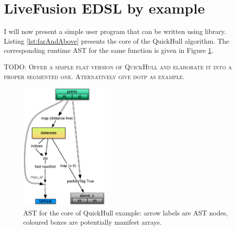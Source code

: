 \documentclass[preamble.tex]{subfiles}
\begin{document}
\section{LiveFusion EDSL by example}

I will now present a simple user program that can be written using \LiveFusion library. Listing \ref{lst:farAndAbove} presents the core of the QuickHull algorithm. The corresponding runtime AST for the same function is given in Figure \ref{fig:QuickHull-flat}.

\textsc{TODO: Offer a simple flat version of QuickHull and elaborate it into a proper segmented one. Aternatively give dotp as example.}


\begin{figure}
\includegraphics[width=0.4\textwidth,center]{img/QuickHull-flat-but-true}
\caption{\label{fig:QuickHull-flat}{AST for the core of QuickHull example: arrow labels are AST nodes, coloured boxes are potentially manifest arrays.}}
\end{figure}
\end{document}
